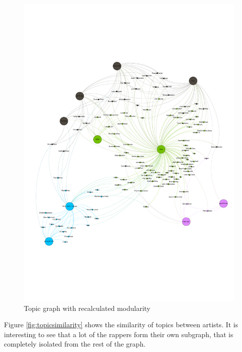 \documentclass[10pt,a4paper]{article}
\begin{document}
		\begin{figure}[htb]
			\centering
			\includegraphics[trim=0mm 50mm 0mm 50mm, clip, width=\linewidth]{data/topic_graph_new_modularity}
			\caption{Topic graph with recalculated modularity}
			\label{fig:topicnewmod}
		\end{figure}
		
		Figure \ref{fig:topicsimilarity} shows the similarity of topics between artists. It is interesting to see that a lot of the rappers form their own subgraph, that is completely isolated from the rest of the graph.
		
\end{document}
